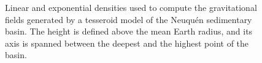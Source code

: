 \documentclass[extra, referee]{gji}
\begin{document}
\begin{figure}
\centering
{}
\caption{
    Linear and exponential densities used to compute the gravitational fields generated
    by a tesseroid model of the Neuqu\'en sedimentary basin.
    The height is defined above the mean Earth radius, and its axis is spanned between
    the deepest and the highest point of the basin.
}
\label{fig:neuquen-basin-densities}
\end{figure}
\end{document}
